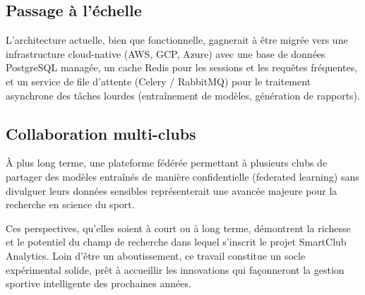 \documentclass{modificopy}
\begin{document}
\subsection*{Passage à l'échelle}

L'architecture actuelle, bien que fonctionnelle, gagnerait à être migrée vers une infrastructure cloud-native (AWS, GCP, Azure) avec une base de données PostgreSQL managée, un cache Redis pour les sessions et les requêtes fréquentes, et un service de file d'attente (Celery / RabbitMQ) pour le traitement asynchrone des tâches lourdes (entraînement de modèles, génération de rapports).

\subsection*{Collaboration multi-clubs}

À plus long terme, une plateforme fédérée permettant à plusieurs clubs de partager des modèles entraînés de manière confidentielle (federated learning) sans divulguer leurs données sensibles représenterait une avancée majeure pour la recherche en science du sport.

Ces perspectives, qu'elles soient à court ou à long terme, démontrent la richesse et le potentiel du champ de recherche dans lequel s'inscrit le projet SmartClub Analytics. Loin d'être un aboutissement, ce travail constitue un socle expérimental solide, prêt à accueillir les innovations qui façonneront la gestion sportive intelligente des prochaines années.

\newpage



\end{document}

